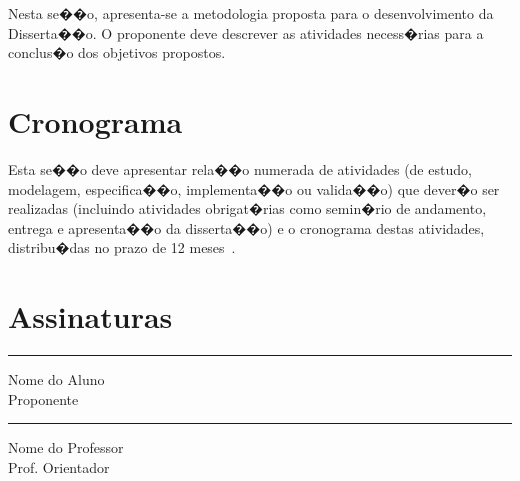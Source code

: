 \documentclass[diss-proposta,nocipinfo]{texufpel}
\begin{document}
Nesta se��o, apresenta-se a metodologia proposta para o
desenvolvimento da Disserta��o. O proponente deve descrever as
atividades necess�rias para a conclus�o dos objetivos propostos. 

\chapter{Cronograma}

Esta se��o deve apresentar rela��o numerada de atividades (de estudo,
modelagem, especifica��o, implementa��o ou valida��o) que dever�o ser
realizadas (incluindo atividades obrigat�rias como semin�rio de
andamento, entrega e apresenta��o da disserta��o) e o cronograma
destas atividades, distribu�das no prazo de 12
meses~\cite{vonNeumann:1966:TSR}.




\chapter{Assinaturas}
\vspace{2cm}

\begin{center}
\rule{8cm}{.3mm}
\medskip

	Nome do Aluno\\
	Proponente

\end{center}

\vspace{4cm}

\begin{center}
\rule{8cm}{.3mm}
\medskip

	Nome do Professor\\
	Prof. Orientador

\end{center}
\end{document}
